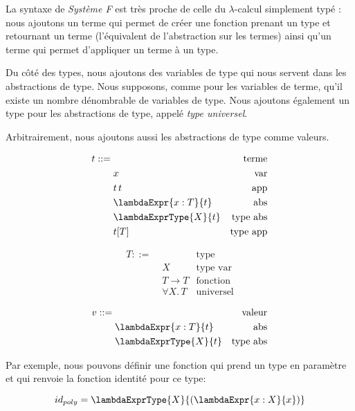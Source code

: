 La syntaxe de \textit{Système F} est très proche de celle du $\lambda$-calcul
simplement typé : nous ajoutons un terme qui permet de créer une fonction
prenant un type et retournant un terme (l'équivalent de l'abstraction sur les
termes) ainsi qu'un terme qui permet d'appliquer un terme à un type.

Du côté des types, nous ajoutons des variables de type qui nous servent
dans les abstractions de type. Nous supposons, comme pour les variables de
terme, qu'il existe un nombre dénombrable de variables de type.
Nous ajoutons également un type pour les abstractions de type, appelé \textit{type universel}.

Arbitrairement, nous ajoutons aussi les abstractions de type comme valeurs.

\begin{minipage}{0.45\textwidth}
  \begin{align*}
    t ::= & \, & \text{terme} \\
          & \; x & \text{var} \\
          & \; t \, t & \text{app} \\
          & \; \lambdaExpr{x : T}{t} & \text{abs} \\
          & \; \lambdaExprType{X}{t} & \text{type abs} \\
          & \; t[T] & \text{type app}
  \end{align*}
\end{minipage}
\begin{minipage}{0.45\textwidth}
  \begin{align*}
    T ::= & \, & \text{type} \\
          & \; X & \text{type var} \\
          & \; T \rightarrow T & \text{fonction} \\
          & \; \forall X . \, T & \text{universel}
  \end{align*}
\end{minipage}
\begin{align*}
  v ::= & \, & \text{valeur} \\
        & \; \lambdaExpr{x : T}{t} & \text{abs} \\
        & \; \lambdaExprType{X}{t} & \text{type abs}
\end{align*}

Par exemple, nous pouvons définir une fonction qui prend un type en paramètre et
qui renvoie la fonction identité pour ce type:

\begin{equation*}
  id_{poly} = \lambdaExprType{X}{(\lambdaExpr{x : X}{x})}
\end{equation*}

